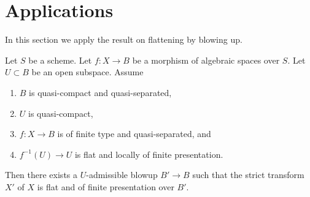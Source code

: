 \section{Applications}
\label{section-applications-flattening-by-blowing-up}

\noindent
In this section we apply the result on flattening by blowing up.

\begin{lemma}
\label{lemma-flat-after-blowing-up}
Let $S$ be a scheme. Let $f : X \to B$ be a morphism of algebraic
spaces over $S$. Let $U \subset B$ be an open subspace. Assume
\begin{enumerate}
\item $B$ is quasi-compact and quasi-separated,
\item $U$ is quasi-compact,
\item $f : X \to B$ is of finite type and quasi-separated, and
\item $f^{-1}(U) \to U$ is flat and locally of finite presentation.
\end{enumerate}
Then there exists a $U$-admissible blowup $B' \to B$ such that
the strict transform $X'$ of $X$ is flat and of finite presentation
over $B'$.
\end{lemma}

